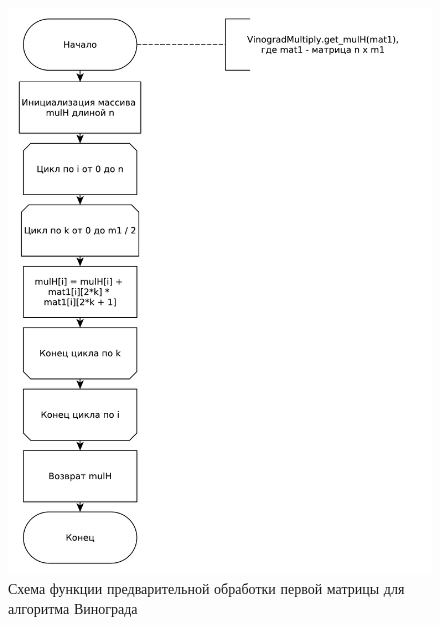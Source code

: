 \documentclass[a4paper,oneside,14pt]{extreport}
\begin{document}
\captionsetup{justification=centering, singlelinecheck=false}

\begin{figure}[H]
	\centering
	\includegraphics[width=0.9\linewidth]{images/vinograd_get_mulh}
	\caption{Схема функции предварительной обработки первой матрицы для алгоритма Винограда}
	\label{fig:vin_mulh}
\end{figure}
\end{document}
